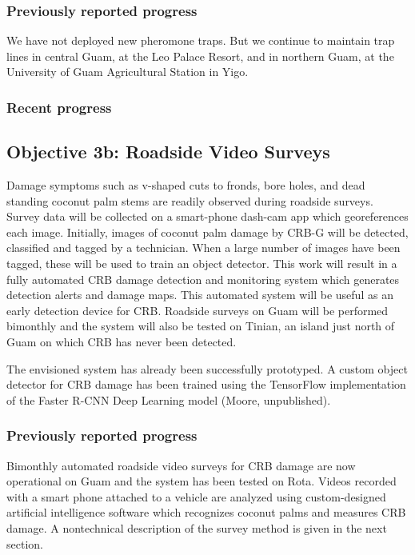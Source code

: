 \documentclass[12pt,letterpaper,english,bibliography=totocnumbered, abstract=on]{scrartcl}
\begin{document}
\subsubsection{Previously reported progress}

We have not deployed new pheromone traps. But we continue to maintain trap lines in central Guam, at the Leo Palace Resort, and in northern Guam, at the University of Guam Agricultural Station in Yigo.

\subsubsection{Recent progress}

\clearpage
\subsection{Objective 3b: Roadside Video Surveys}

\begin{framed}
Damage symptoms such as v-shaped cuts to fronds, bore holes, and dead standing coconut palm stems are readily observed during roadside surveys. Survey data will be collected on a smart-phone dash-cam app which georeferences each image. Initially, images of coconut palm damage by CRB-G will be detected, classified and tagged by a technician. When a large number of images have been tagged, these will be used to train an object detector. This work will result in a fully automated CRB damage detection and monitoring system which generates detection alerts and damage maps. This automated system will be useful as an early detection device for CRB. Roadside surveys on Guam will be performed bimonthly and the system will also be tested on Tinian, an island just north of Guam on which CRB has never been detected.

The envisioned system has already been successfully prototyped. A custom object detector for CRB damage has been trained using the TensorFlow implementation of the Faster R-CNN Deep Learning model (Moore, unpublished).
\end{framed}

\subsubsection{Previously reported progress}

Bimonthly automated roadside video surveys for CRB damage are now operational on Guam and the system has been tested on Rota. Videos recorded with a smart phone attached to a vehicle are analyzed using custom-designed artificial intelligence software which recognizes coconut palms and measures CRB damage. A nontechnical description of the survey method is given in the next section.
\end{document}
